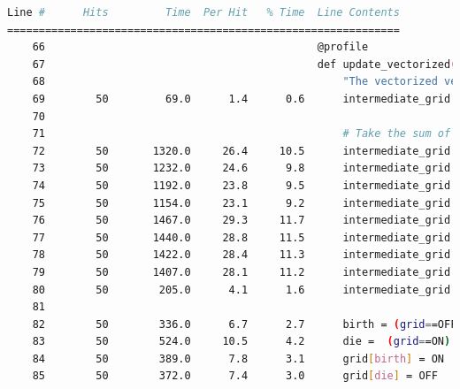 \documentclass[a4paper,12pt]{article}
\begin{document}
\begin{lstlisting}[language=bash,basicstyle=\tiny\ttfamily]
Line #      Hits         Time  Per Hit   % Time  Line Contents
==============================================================
    66                                           @profile                                                                   
    67                                           def update_vectorized(grid, n):                                            
    68                                               "The vectorized version of the grid update in conway's game of life"   
    69        50         69.0      1.4      0.6      intermediate_grid = np.zeros(grid.shape)                               
    70                                                                                                                      
    71                                               # Take the sum of the 8 neighbours, using in place operations          
    72        50       1320.0     26.4     10.5      intermediate_grid += np.roll(grid, (0, 1), (0, 1))                     
    73        50       1232.0     24.6      9.8      intermediate_grid += np.roll(grid, (0, -1), (0, 1))                    
    74        50       1192.0     23.8      9.5      intermediate_grid += np.roll(grid, (1, 0), (0, 1))                     
    75        50       1154.0     23.1      9.2      intermediate_grid += np.roll(grid, (-1, 0), (0, 1))                    
    76        50       1467.0     29.3     11.7      intermediate_grid += np.roll(grid, (1, 1), (0, 1))                     
    77        50       1440.0     28.8     11.5      intermediate_grid += np.roll(grid, (1, -1), (0, 1))                    
    78        50       1422.0     28.4     11.3      intermediate_grid += np.roll(grid, (-1, 1), (0, 1))                    
    79        50       1407.0     28.1     11.2      intermediate_grid += np.roll(grid, (-1, -1), (0, 1))                   
    80        50        205.0      4.1      1.6      intermediate_grid /= 255                                               
    81                                                                                                                      
    82        50        336.0      6.7      2.7      birth = (grid==OFF) & (intermediate_grid==3)                           
    83        50        524.0     10.5      4.2      die =  (grid==ON) & ((intermediate_grid < 2) | (intermediate_grid > 3))
    84        50        389.0      7.8      3.1      grid[birth] = ON                                                       
    85        50        372.0      7.4      3.0      grid[die] = OFF                                                        



\end{lstlisting}
\end{document}
